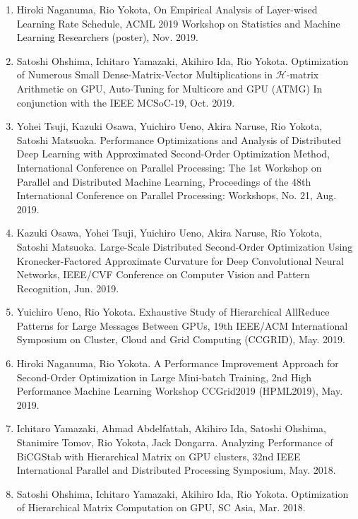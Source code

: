 \documentclass[margin,line]{cv}
\begin{document}
\begin{resume}
\begin{enumerate}
\item Hiroki Naganuma, Rio Yokota, On Empirical Analysis of Layer-wised Learning Rate Schedule, ACML 2019 Workshop on Statistics and Machine Learning Researchers (poster), Nov. 2019.

\item Satoshi Ohshima, Ichitaro Yamazaki, Akihiro Ida, Rio Yokota. Optimization of Numerous Small Dense-Matrix-Vector Multiplications in $\mathcal{H}$-matrix Arithmetic on GPU, Auto-Tuning for Multicore and GPU (ATMG) In conjunction with the IEEE MCSoC-19, Oct. 2019.

\item Yohei Tsuji, Kazuki Osawa, Yuichiro Ueno, Akira Naruse, Rio Yokota, Satoshi Matsuoka. Performance Optimizations and Analysis of Distributed Deep Learning with Approximated Second-Order Optimization Method, International Conference on Parallel Processing: The 1st Workshop on Parallel and Distributed Machine Learning, Proceedings of the 48th International Conference on Parallel Processing: Workshops, No. 21, Aug. 2019.

\item Kazuki Osawa, Yohei Tsuji, Yuichiro Ueno, Akira Naruse, Rio Yokota, Satoshi Matsuoka. Large-Scale Distributed Second-Order Optimization Using Kronecker-Factored Approximate Curvature for Deep Convolutional Neural Networks, IEEE/CVF Conference on Computer Vision and Pattern Recognition, Jun. 2019.

\item Yuichiro Ueno, Rio Yokota. Exhaustive Study of Hierarchical AllReduce Patterns for Large Messages Between GPUs, 19th IEEE/ACM International Symposium on Cluster, Cloud and Grid Computing (CCGRID), May. 2019.

\item Hiroki Naganuma, Rio Yokota. A Performance Improvement Approach for Second-Order Optimization in Large Mini-batch Training, 2nd High Performance Machine Learning Workshop CCGrid2019 (HPML2019), May. 2019.

\item Ichitaro Yamazaki, Ahmad Abdelfattah, Akihiro Ida, Satoshi Ohshima, Stanimire Tomov, Rio Yokota, Jack Dongarra. Analyzing Performance of BiCGStab with Hierarchical Matrix on GPU clusters, 32nd IEEE International Parallel and Distributed Processing Symposium, May. 2018.

\item Satoshi Ohshima, Ichitaro Yamazaki, Akihiro Ida, Rio Yokota. Optimization of Hierarchical Matrix Computation on GPU, SC Asia, Mar. 2018.


\end{enumerate}
\end{resume}
\end{document}
